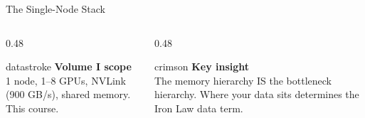 \documentclass[aspectratio=169, 12pt]{beamer}
\begin{document}
\begin{frame}{The Single-Node Stack}
\vspace{0.15cm}
\small
\begin{columns}[T]
  \begin{column}{0.48\textwidth}
    \begin{mlsyscard}{datastroke}
    \textbf{Volume I scope}\\
    {\footnotesize 1 node, 1--8 GPUs, NVLink (900 GB/s), shared memory. This course.}
    \end{mlsyscard}
  \end{column}
  \begin{column}{0.48\textwidth}
    \begin{mlsyscard}{crimson}
    \textbf{Key insight}\\
    {\footnotesize The memory hierarchy IS the bottleneck hierarchy. Where your data sits determines the Iron Law data term.}
    \end{mlsyscard}
  \end{column}
\end{columns}

\end{frame}
\end{document}
